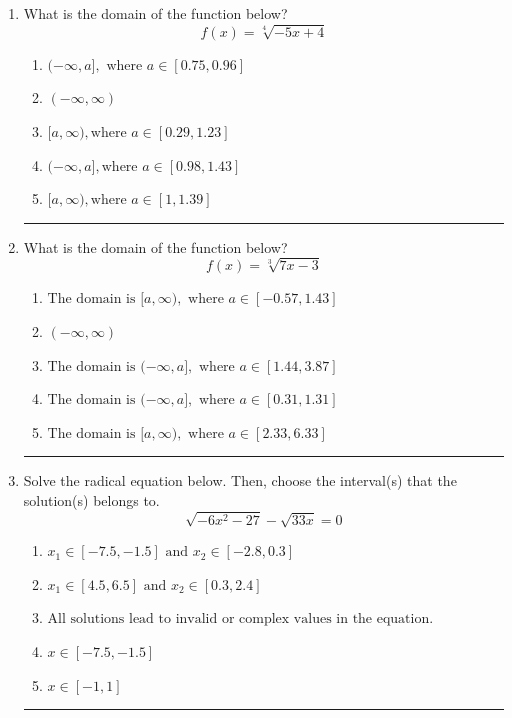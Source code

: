 \documentclass[14pt]{extbook}
\newcommand{\litem}[1]{\item#1\hspace*{-1cm}\rule{\textwidth}{0.4pt}}
\begin{document}
\begin{enumerate}
{\begin{enumerate}[label=\Alph*.]
\end{enumerate} }
\litem{
What is the domain of the function below?\[ f(x) = \sqrt[4]{-5 x + 4} \]\begin{enumerate}[label=\Alph*.]
\item \( (-\infty, a], \text{ where } a \in [0.75, 0.96] \)
\item \( (-\infty, \infty) \)
\item \( [a, \infty), \text{where } a \in [0.29, 1.23] \)
\item \( (-\infty, a], \text{where } a \in [0.98, 1.43] \)
\item \( [a, \infty), \text{where } a \in [1, 1.39] \)

\end{enumerate} }
\litem{
What is the domain of the function below?\[ f(x) = \sqrt[3]{7 x - 3} \]\begin{enumerate}[label=\Alph*.]
\item \( \text{The domain is } [a, \infty), \text{   where } a \in [-0.57, 1.43] \)
\item \( (-\infty, \infty) \)
\item \( \text{The domain is } (-\infty, a], \text{   where } a \in [1.44, 3.87] \)
\item \( \text{The domain is } (-\infty, a], \text{   where } a \in [0.31, 1.31] \)
\item \( \text{The domain is } [a, \infty), \text{   where } a \in [2.33, 6.33] \)

\end{enumerate} }
\litem{
Solve the radical equation below. Then, choose the interval(s) that the solution(s) belongs to.\[ \sqrt{-6 x^2 - 27} - \sqrt{33 x} = 0 \]\begin{enumerate}[label=\Alph*.]
\item \( x_1 \in [-7.5, -1.5] \text{ and } x_2 \in [-2.8,0.3] \)
\item \( x_1 \in [4.5, 6.5] \text{ and } x_2 \in [0.3,2.4] \)
\item \( \text{All solutions lead to invalid or complex values in the equation.} \)
\item \( x \in [-7.5,-1.5] \)
\item \( x \in [-1,1] \)


\end{enumerate}}
\end{enumerate}
\end{document}

